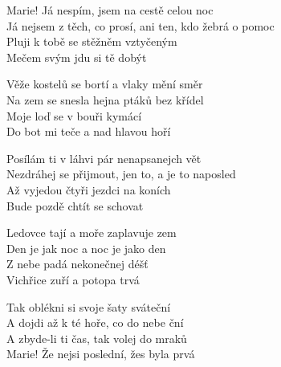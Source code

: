 
\ve{}
Marie! Já nespím, jsem na cestě celou noc\\
Já nejsem z těch, co prosí, ani ten, kdo žebrá o pomoc\\
Pluji k tobě se stěžněm vztyčeným \\
Mečem svým jdu si tě dobýt

\ve{}
Věže kostelů se bortí a vlaky mění směr\\
Na zem se snesla hejna ptáků bez křídel\\
Moje loď se v bouři kymácí\\
Do bot mi teče a nad hlavou hoří

\ve{}
Posílám ti v láhvi pár nenapsanejch vět\\
Nezdráhej se přijmout, jen to, a je to naposled\\
Až vyjedou čtyři jezdci na koních\\
Bude pozdě chtít se schovat

\ve{}
Ledovce tají a moře zaplavuje zem\\
Den je jak noc a noc je jako den\\
Z nebe padá nekonečnej déšť\\
Vichřice zuří a potopa trvá

\ve{}
Tak oblékni si svoje šaty sváteční\\
A dojdi až k té hoře, co do nebe ční\\
A zbyde-li ti čas, tak volej do mraků\\
Marie! Že nejsi poslední, žes byla prvá

\esong